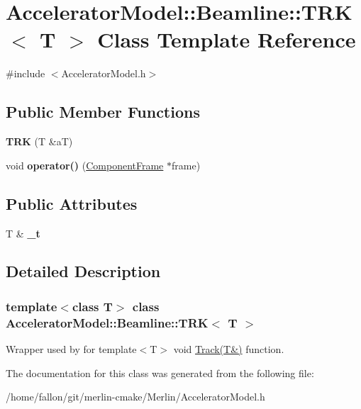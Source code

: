 \hypertarget{classAcceleratorModel_1_1Beamline_1_1TRK}{}\section{Accelerator\+Model\+:\+:Beamline\+:\+:T\+RK$<$ T $>$ Class Template Reference}
\label{classAcceleratorModel_1_1Beamline_1_1TRK}


{\ttfamily \#include $<$Accelerator\+Model.\+h$>$}

\subsection*{Public Member Functions}
\begin{DoxyCompactItemize}
\item 
\mbox{\label{classAcceleratorModel_1_1Beamline_1_1TRK_a8285a36a29c3214112f384a0c7114085}} 
{\bfseries T\+RK} (T \&aT)
\item 
\mbox{\label{classAcceleratorModel_1_1Beamline_1_1TRK_a2b76ce50fdb35c047658319e11b5f62f}} 
void {\bfseries operator()} (\hyperlink{classComponentFrame}{Component\+Frame} $\ast$frame)
\end{DoxyCompactItemize}
\subsection*{Public Attributes}
\begin{DoxyCompactItemize}
\item 
\mbox{\label{classAcceleratorModel_1_1Beamline_1_1TRK_a89532ea8603cc4e2ff6458f568c59e58}} 
T \& {\bfseries \+\_\+t}
\end{DoxyCompactItemize}


\subsection{Detailed Description}
\subsubsection*{template$<$class T$>$\newline
class Accelerator\+Model\+::\+Beamline\+::\+T\+R\+K$<$ T $>$}

Wrapper used by for template$<$\+T$>$ void \hyperlink{classAcceleratorModel_1_1Beamline_af48fc0105707f1b09e5b343ffa829854}{Track(\+T\&)} function. 

The documentation for this class was generated from the following file\+:\begin{DoxyCompactItemize}
\item 
/home/fallon/git/merlin-\/cmake/\+Merlin/Accelerator\+Model.\+h\end{DoxyCompactItemize}
